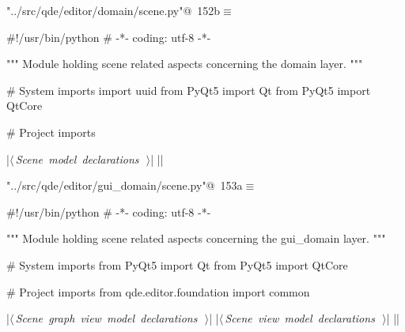 \documentclass[%
    a4paper,    %
    justified,  %
    nobib,      %
    openany     %
]{tufte-book}
\begin{document}
\begin{flushleft} \small
\begin{minipage}{\linewidth}\label{scrap169}\raggedright\small
{} \verb@"../src/qde/editor/domain/scene.py"@\nobreak\ {\footnotesize {152b}}$\equiv$
\vspace{-1ex}
\begin{pythoncode}
#!/usr/bin/python
# -*- coding: utf-8 -*-

""" Module holding scene related aspects concerning the domain layer. """

# System imports
import uuid
from PyQt5 import Qt
from PyQt5 import QtCore

# Project imports


|\hbox{$\langle\,${\itshape Scene model declarations}\nobreak\ {\footnotesize {}}$\,\rangle$}|
|\NWsep|
\end{pythoncode}
\vspace{1.5ex}
\footnotesize
\begin{list}{}{\setlength{\itemsep}{-\parsep}\setlength{\itemindent}{-\leftmargin}}

\item{}
\end{list}
\end{minipage}\vspace{4ex}
\end{flushleft}
\begin{flushleft} \small
\begin{minipage}{\linewidth}\label{scrap170}\raggedright\small
{} \verb@"../src/qde/editor/gui_domain/scene.py"@\nobreak\ {\footnotesize {153a}}$\equiv$
\vspace{-1ex}
\begin{pythoncode}

#!/usr/bin/python
# -*- coding: utf-8 -*-

""" Module holding scene related aspects concerning the gui_domain layer. """

# System imports
from PyQt5 import Qt
from PyQt5 import QtCore

# Project imports
from qde.editor.foundation import common

|\hbox{$\langle\,${\itshape Scene graph view model declarations}\nobreak\ {\footnotesize {}}$\,\rangle$}|
|\hbox{$\langle\,${\itshape Scene view model declarations}\nobreak\ {\footnotesize {}}$\,\rangle$}|
|\NWsep|
\end{pythoncode}
\vspace{1.5ex}
\footnotesize
\begin{list}{}{\setlength{\itemsep}{-\parsep}\setlength{\itemindent}{-\leftmargin}}

\item{}
\end{list}
\end{minipage}\vspace{4ex}
\end{flushleft}
\end{document}

